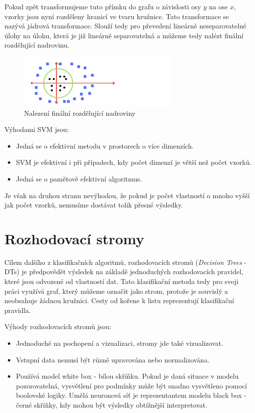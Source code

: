 Pokud zpět transformujeme tuto přímku do grafu o závislosti osy $y$ na ose $x$, vzorky jsou nyní rozděleny hranicí ve tvaru kružnice. Tato transformace se nazývá jádrová transformace. Slouží tedy pro převedení lineárně neseparovatelné úlohy na úlohu, která je již lineárně separovatelná a můžeme tedy nalézt finální rozdělující nadrovinu. \cite{MediumSVM}

\begin{figure}[!htbp]
    \centering
    \includegraphics[width=300px]{obrazky-figures/mediumsvm3.png}
    \caption{Nalezení finální rozdělující nadroviny \cite{MediumSVM}}
\end{figure}

Výhodami SVM jsou: \cite{ScikitSVM}
\begin{itemize}
    \item Jedná se o efektivní metodu v prostorech o více dimenzích.
    \item SVM je efektivní i při případech, kdy počet dimenzí je větší než počet vzorků.
    \item Jedná se o pamětově efektivní algoritmus.
\end{itemize}

Je však na druhou stranu nevýhodou, že pokud je počet vlastností o mnoho vyšší jak počet vzorků, nemusíme dostávat tolik přesné výsledky. 

\section{Rozhodovací stromy}
Cílem dalšího z klasifikačních algoritmů, rozhodovacích stromů (\textit{Decision Trees} - DTs) je předpovědět výsledek na základě jednoduchých rozhodovacích pravidel, které jsou odvozené od vlastností dat. Tato klasifikační metoda tedy pro svoji práci využívá graf, který můžeme označit jako strom, protože je souvislý a neobsahuje žádnou kružnici. Cesty od kořene k listu reprezentují klasifikační pravidla. 

Výhody rozhodovacích stromů jsou: \cite{ScikitDTs}
\begin{itemize}
    \item Jednoduché na pochopení a vizualizaci, stromy jde také vizualizovat.
    \item Vstupní data nemusí být různě upravována nebo normalizována.
    \item Používá model white box - bílou skříňku. Pokud je daná situace v modelu pozorovatelná, vysvětlení pro podmínky může být snadno vysvětleno pomocí boolovské logiky. Umělá neuronová síť je reprezentantem modelu black box - černé skříňky, kdy mohou být výsledky obtížnější interpretovat. 
\end{itemize}


